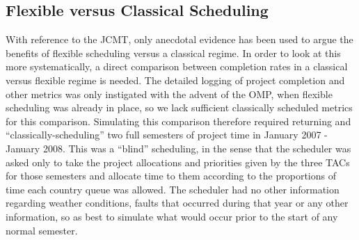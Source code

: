 \documentclass[]{spie}  %
\begin{document}
 
\subsection{Flexible versus Classical Scheduling}\label{sec:sched}

With reference to the JCMT, only anecdotal evidence has been used to
argue the benefits of flexible scheduling versus a classical regime.
In order to look at this more systematically, a direct comparison
between completion rates in a classical versus flexible regime is
needed. The detailed logging of project completion and other metrics
was only instigated with the advent of the OMP, when flexible
scheduling was already in place, so we lack sufficient classically
scheduled metrics for this comparison. Simulating this comparison
therefore required returning and ``classically-scheduling'' two full
semesters of project time in January 2007 - January 2008. This was a
``blind'' scheduling, in the sense that the scheduler was asked only to
take the project allocations and priorities given by the three TACs
for those semesters and allocate time to them according to the
proportions of time each country queue was allowed. The scheduler had
no other information regarding weather conditions, faults that
occurred during that year or any other information, so as best to
simulate what would occur prior to the start of any normal semester.
\end{document}
